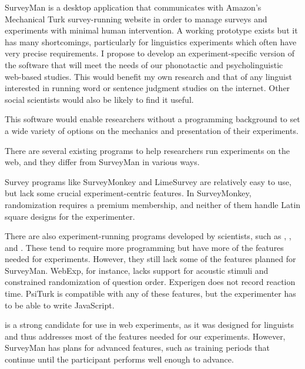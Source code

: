 SurveyMan is a desktop application that communicates with Amazon's Mechanical
Turk survey-running website in order to manage surveys and experiments with
minimal human intervention. A working prototype exists but it has many
shortcomings, particularly for linguistics experiments which often have very
precise requirements. I propose to develop an experiment-specific version of
the software that will meet the needs of our phonotactic and psycholinguistic
web-based studies. This would benefit my own research and that of
any linguist interested in running word or sentence judgment studies on the
internet. Other social scientists would also be likely to find it useful.

This software would enable researchers without a programming background
to set a wide variety of options on the mechanics and presentation of their
experiments.

There are several existing programs to help researchers run experiments on the web, and they differ
from SurveyMan in various ways.

Survey programs like SurveyMonkey and LimeSurvey are relatively easy to use, but lack some
crucial experiment-centric features. In SurveyMonkey, randomization requires a premium membership,
and neither of them handle Latin square designs for the experimenter.

There are also experiment-running programs developed by scientists, such as \citet{WebExp}, \citet{Experigen},
and \citet{PsiTurk}. These tend to require more programming but have more of the features needed for experiments.
However, they still lack some of the features planned for SurveyMan. WebExp, for instance, lacks support for
acoustic stimuli and constrained randomization of question order. Experigen does not record reaction time. PsiTurk
is compatible with any of these features, but the experimenter has to be able to write JavaScript.

\citet{IbexFarm} is a strong candidate for use in web experiments, as it was designed for linguists and thus addresses
most of the features needed for our experiments. However, SurveyMan has plans for advanced features, such as training
periods that continue until the participant performs well enough to advance.

